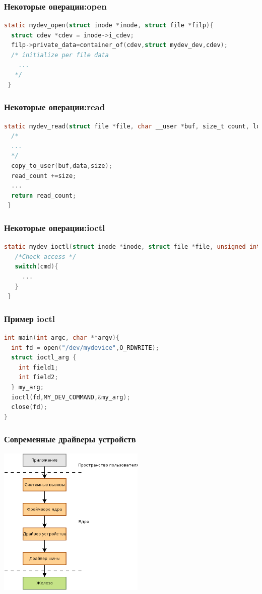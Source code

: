 \begin{frame}[fragile]
  \frametitle{Некоторые операции:open}
\begin{lstlisting}[language=C]
static mydev_open(struct inode *inode, struct file *filp){
  struct cdev *cdev = inode->i_cdev;
  filp->private_data=container_of(cdev,struct mydev_dev,cdev);
  /* initialize per file data
    ...
   */
 }
\end{lstlisting}
\end{frame}

\begin{frame}[fragile]
  \frametitle{Некоторые операции:read}
\begin{lstlisting}[language=C]
static mydev_read(struct file *file, char __user *buf, size_t count, loff_t *ppos){
  /*
  ...
  */
  copy_to_user(buf,data,size);
  read_count +=size;
  ...
  return read_count;
 }
\end{lstlisting}
\end{frame}
\begin{frame}[fragile]
  \frametitle{Некоторые операции:ioctl}
\begin{lstlisting}[language=C]
 static mydev_ioctl(struct inode *inode, struct file *file, unsigned int cmd, unsigned long arg){
   /*Check access */
   switch(cmd){
     ...
   }
 }
\end{lstlisting}
\end{frame}
\begin{frame}[fragile]
  \frametitle{Пример ioctl}
\begin{lstlisting}[language=C]
int main(int argc, char **argv){
  int fd = open("/dev/mydevice",O_RDWRITE);
  struct ioctl_arg {
    int field1;
    int field2;
  } my_arg;
  ioctl(fd,MY_DEV_COMMAND,&my_arg);
  close(fd);
}
\end{lstlisting}
\end{frame}

\begin{frame}[fragile]
  \frametitle{Современные драйверы устройств}
  \includegraphics[width=7cm]{driver-architecture2.png}
\end{frame}  


